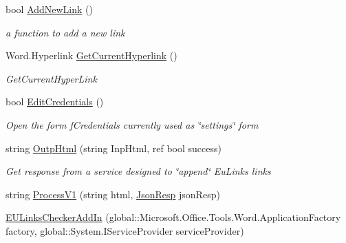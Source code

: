 \begin{DoxyCompactItemize}
\item 
bool \hyperlink{class_e_u_cases_1_1_e_u_links_checker_word_add_in_1_1_e_u_links_checker_add_in_a6d760146925afd4212ce491358efbba0}{Add\+New\+Link} ()
\begin{DoxyCompactList}\small\item\em a function to add a new link \end{DoxyCompactList}\item 
Word.\+Hyperlink \hyperlink{class_e_u_cases_1_1_e_u_links_checker_word_add_in_1_1_e_u_links_checker_add_in_af72cbd12baf3dd30963f86b2b0b00acf}{Get\+Current\+Hyperlink} ()
\begin{DoxyCompactList}\small\item\em Get\+Current\+Hyper\+Link \end{DoxyCompactList}\item 
bool \hyperlink{class_e_u_cases_1_1_e_u_links_checker_word_add_in_1_1_e_u_links_checker_add_in_a81a7de626e6020bab16b8234bbf022f5}{Edit\+Credentials} ()
\begin{DoxyCompactList}\small\item\em Open the form f\+Credentials currently used as \char`\"{}settings\char`\"{} form \end{DoxyCompactList}\item 
string \hyperlink{class_e_u_cases_1_1_e_u_links_checker_word_add_in_1_1_e_u_links_checker_add_in_ae0b4a2bc3f30ccfae6dac59419108ff6}{Outp\+Html} (string Inp\+Html, ref bool success)
\begin{DoxyCompactList}\small\item\em Get response from a service designed to \char`\"{}append\char`\"{} Eu\+Links links \end{DoxyCompactList}\item 
string \hyperlink{class_e_u_cases_1_1_e_u_links_checker_word_add_in_1_1_e_u_links_checker_add_in_a44b7e06ab5771acfe9471ac472b1b6fb}{Process\+V1} (string html, \hyperlink{class_e_u_cases_1_1_e_u_links_checker_word_add_in_1_1_e_u_links_checker_add_in_1_1_json_resp}{Json\+Resp} json\+Resp)
\item 
\hyperlink{class_e_u_cases_1_1_e_u_links_checker_word_add_in_1_1_e_u_links_checker_add_in_a5a8684fb114c9fbb6ecc1e2e6e4dfd43}{E\+U\+Links\+Checker\+Add\+In} (global\+::\+Microsoft.\+Office.\+Tools.\+Word.\+Application\+Factory factory, global\+::\+System.\+I\+Service\+Provider service\+Provider)
\end{DoxyCompactItemize}

